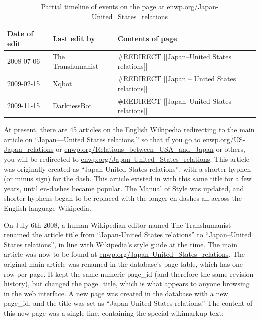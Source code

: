 \documentclass[format=acmsmall, review=false, screen=true]{acmart}%
\begin{document}
\begin{table}[h]
\centering
\caption{Partial timeline of events on the page at \url{enwp.org/Japan-United_States_relations}}
\label{Japantable}
\begin{tabular}{|l|l|l|}
\hline
\textbf{Date of edit} & \textbf{Last edit by} & \textbf{Contents of page}                              \\ \hline
2008-07-06            & The Transhumanist     & \#REDIRECT {[}{[}Japan--United States relations{]}{]}   \\ \hline
2009-02-15            & Xqbot                 & \#REDIRECT {[}{[}Japan -- United States relations{]}{]} \\ \hline
2009-11-15           & DarknessBot           & \#REDIRECT {[}{[}Japan--United States relations{]}{]}   \\ \hline
\end{tabular}
\end{table}


At present, there are 45 articles on the English Wikipedia redirecting to the main article on ``Japan---United States relations,'' so that if you go to \url{enwp.org/US-Japan\_relations} or \url{enwp.org/Relations\_between\_USA\_and\_Japan} or others, you will be redirected to \href{http://enwp.org/Japan–United\_States\_relations}{enwp.org/Japan–United\_States\_relations}. This article was originally created as ``Japan-United States relations'', with a shorter hyphen (or minus sign) for the dash. This article existed in with this same title for a few years, until en-dashes became popular. The Manual of Style was updated, and shorter hyphens began to be replaced with the longer en-dashes all across the English-language Wikipedia.  

On July 6th 2008, a human Wikipedian editor named The Transhumanist renamed the article title from ``Japan-United States relations'' to ``Japan--United States relations'', in line with Wikipedia's style guide at the time. The main article was now to be found at \href{http://enwp.org/Japan–United\_States\_relations}{enwp.org/Japan–United\_States\_relations}. The original main article was renamed in the database's page table, which has one row per page. It kept the same numeric page\_id (and therefore the same revision history), but changed the page\_title, which is what appears to anyone browsing in the web interface. A new page was created in the database with a new page\_id, and the title was set as ``Japan-United States relations.'' The content of this new page was a single line, containing the special wikimarkup text:  
\end{document}
